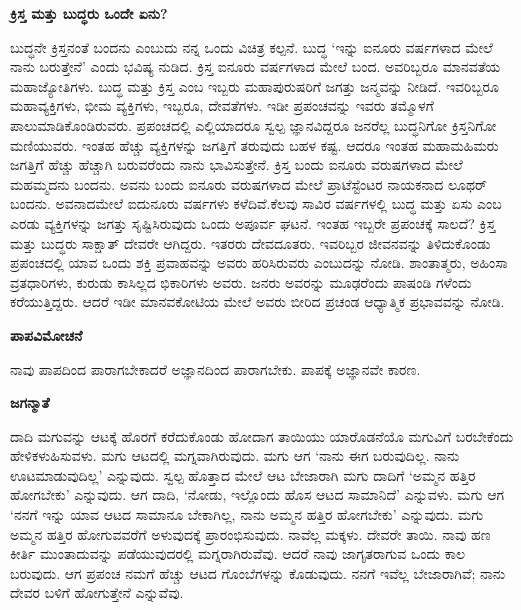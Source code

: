 \begin{center}
\textbf{ಕ್ರಿಸ್ತ ಮತ್ತು ಬುದ್ಧರು ಒಂದೇ ಏನು?}
\end{center}

ಬುದ್ಧನೇ ಕ್ರಿಸ್ತನಂತೆ ಬಂದನು ಎಂಬುದು ನನ್ನ ಒಂದು ವಿಚಿತ್ರ ಕಲ್ಪನೆ. ಬುದ್ಧ ‘ಇನ್ನು ಐನೂರು ವರ್ಷಗಳಾದ ಮೇಲೆ ನಾನು ಬರುತ್ತೇನೆ’ ಎಂದು ಭವಿಷ್ಯ ನುಡಿದ. ಕ್ರಿಸ್ತ ಐನೂರು ವರ್ಷಗಳಾದ ಮೇಲೆ ಬಂದ. ಅವರಿಬ್ಬರೂ ಮಾನವತೆಯ ಮಹಾಜ್ಯೋತಿಗಳು. ಬುದ್ಧ ಮತ್ತು ಕ್ರಿಸ್ತ ಎಂಬ ಇಬ್ಬರು ಮಹಾಪುರುಷರಿಗೆ ಜಗತ್ತು ಜನ್ಮವನ್ನು ನೀಡಿದೆ. ಇವರಿಬ್ಬರೂ ಮಹಾವ್ಯಕ್ತಿಗಳು, ಭೀಮ ವ್ಯಕ್ತಿಗಳು, ಇಬ್ಬರೂ, ದೇವತೆಗಳು. ಇಡೀ ಪ್ರಪಂಚವನ್ನು ಇವರು ತಮ್ಮೊಳಗೆ ಪಾಲುಮಾಡಿಕೊಂಡಿರುವರು. ಪ್ರಪಂಚದಲ್ಲಿ ಎಲ್ಲಿಯಾದರೂ ಸ್ವಲ್ಪ ಜ್ಞಾನವಿದ್ದರೂ ಜನರೆಲ್ಲ ಬುದ್ಧನಿಗೋ ಕ್ರಿಸ್ತನಿಗೋ ಮಣಿಯುವರು. ಇಂತಹ ಹೆಚ್ಚು ವ್ಯಕ್ತಿಗಳನ್ನು ಜಗತ್ತಿಗೆ ತರುವುದು ಬಹಳ ಕಷ್ಟ. ಆದರೂ ಇಂತಹ ಮಹಾಮಹಿಮರು ಜಗತ್ತಿಗೆ ಹೆಚ್ಚು ಹೆಚ್ಚಾಗಿ ಬರುವರೆಂದು ನಾನು ಭಾವಿಸುತ್ತೇನೆ. ಕ್ರಿಸ್ತ ಬಂದು ಐನೂರು ವರುಷಗಳಾದ ಮೇಲೆ ಮಹಮ್ಮದನು ಬಂದನು. ಅವನು ಬಂದು ಐನೂರು ವರುಷಗಳಾದ ಮೇಲೆ ಪ್ರಾಟೆಸ್ಟೆಂಟರ ನಾಯಕನಾದ ಲೂಥರ್​ ಬಂದನು. ಅವನಾದಮೇಲೆ ಐದುನೂರು ವರ್ಷಗಳು ಕಳೆದಿವೆ.ಕೆಲವು ಸಾವಿರ ವರ್ಷಗಳಲ್ಲಿ ಬುದ್ಧ ಮತ್ತು ಏಸು ಎಂಬ ಎರಡು ವ್ಯಕ್ತಿಗಳನ್ನು ಜಗತ್ತು ಸೃಷ್ಟಿಸಿರುವುದು ಒಂದು ಅಪೂರ್ವ ಘಟನೆ. ಇಂತಹ ಇಬ್ಬರೇ ಪ್ರಪಂಚಕ್ಕೆ ಸಾಲದೆ? ಕ್ರಿಸ್ತ ಮತ್ತು ಬುದ್ಧರು ಸಾಕ್ಷಾತ್​ ದೇವರೇ ಆಗಿದ್ದರು. ಇತರರು ದೇವದೂತರು. ಇವರಿಬ್ಬರ ಜೀವನವನ್ನು ತಿಳಿದುಕೊಂಡು ಪ್ರಪಂಚದಲ್ಲಿ ಯಾವ ಒಂದು ಶಕ್ತಿ ಪ್ರವಾಹವನ್ನು ಅವರು ಹರಿಸಿರುವರು ಎಂಬುದನ್ನು ನೋಡಿ. ಶಾಂತಾತ್ಮರು, ಅಹಿಂಸಾ ವ್ರತಧಾರಿಗಳು, ಕುರುಡು ಕಾಸಿಲ್ಲದ ಭಿಕಾರಿಗಳು ಅವರು. ಜನರು ಅವರನ್ನು ಮೂಢರೆಂದು ಪಾಷಂಡಿ ಗಳೆಂದು ಕರೆಯುತ್ತಿದ್ದರು. ಆದರೆ ಇಡೀ ಮಾನವಕೋಟಿಯ ಮೇಲೆ ಅವರು ಬೀರಿದ ಪ್ರಚಂಡ ಆಧ್ಯಾತ್ಮಿಕ ಪ್ರಭಾವವನ್ನು ನೋಡಿ.

\begin{center}
\textbf{ಪಾಪವಿಮೋಚನೆ}
\end{center}

ನಾವು ಪಾಪದಿಂದ ಪಾರಾಗಬೇಕಾದರೆ ಅಜ್ಞಾನದಿಂದ ಪಾರಾಗಬೇಕು. ಪಾಪಕ್ಕೆ ಅಜ್ಞಾನವೇ ಕಾರಣ.

\begin{center}
\textbf{ಜಗನ್ಮಾತೆ}
\end{center}

ದಾದಿ ಮಗುವನ್ನು ಆಟಕ್ಕೆ ಹೊರಗೆ ಕರೆದುಕೊಂಡು ಹೋದಾಗ ತಾಯಿಯು ಯಾರೊಡನೆಯೊ ಮಗುವಿಗೆ ಬರಬೇಕೆಂದು ಹೇಳಿಕಳುಹಿಸುವಳು. ಮಗು ಆಟದಲ್ಲಿ ಮಗ್ನವಾಗಿರುವುದು. ಮಗು ಆಗ ‘ನಾನು ಈಗ ಬರುವುದಿಲ್ಲ. ನಾನು ಊಟಮಾಡುವುದಿಲ್ಲ’ ಎನ್ನುವುದು. ಸ್ವಲ್ಪ ಹೊತ್ತಾದ ಮೇಲೆ ಆಟ ಬೇಜಾರಾಗಿ ಮಗು ದಾದಿಗೆ ‘ಅಮ್ಮನ ಹತ್ತಿರ ಹೋಗಬೇಕು’ ಎನ್ನುವುದು. ಆಗ ದಾದಿ, ‘ನೋಡು, ಇಲ್ಲೊಂದು ಹೊಸ ಆಟದ ಸಾಮಾನಿದೆ’ ಎನ್ನುವಳು. ಮಗು ಆಗ ‘ನನಗೆ ಇನ್ನು ಯಾವ ಆಟದ ಸಾಮಾನೂ ಬೇಕಾಗಿಲ್ಲ, ನಾನು ಅಮ್ಮನ ಹತ್ತಿರ ಹೋಗಬೇಕು’ ಎನ್ನುವುದು. ಮಗು ಅಮ್ಮನ ಹತ್ತಿರ ಹೋಗುವವರೆಗೆ ಅಳುವುದಕ್ಕೆ ಪ್ರಾರಂಭಿಸುವುದು. ನಾವೆಲ್ಲ ಮಕ್ಕಳು. ದೇವರೇ ತಾಯಿ. ನಾವು ಹಣ ಕೀರ್ತಿ ಮುಂತಾದುವನ್ನು ಪಡೆಯುವುದರಲ್ಲಿ ಮಗ್ನರಾಗಿರುವೆವು. ಆದರೆ ನಾವು ಜಾಗೃತರಾಗುವ ಒಂದು ಕಾಲ ಬರುವುದು. ಆಗ ಪ್ರಪಂಚ ನಮಗೆ ಹೆಚ್ಚು ಆಟದ ಗೊಂಬೆಗಳನ್ನು ಕೊಡುವುದು. ನನಗೆ ಇವೆಲ್ಲ ಬೇಜಾರಾಗಿವೆ; ನಾನು ದೇವರ ಬಳಿಗೆ ಹೋಗುತ್ತೇನೆ ಎನ್ನುವೆವು.

